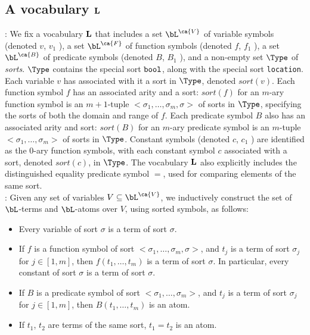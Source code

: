 \subsection{A vocabulary ${\bf L}$}\label{sec:alpha}

: We fix a vocabulary ${\bf L}$
that includes a set $\bL^{\ca{V}}$ of variable symbols (denoted $v$,
$v_1$ \etc), a set $\bL^{\ca{F}}$ of function symbols (denoted $f$,
$f_1$ \etc), a set $\bL^{\ca{B}}$ of predicate symbols (denoted $B$,
$B_1$ \etc), and a non-empty set $\Type$ of {\em sorts}.  $\Type$
contains the special sort ${\tt bool}$,  along with the special sort
{\tt location}. Each variable $v$ has associated with it a sort in
$\Type$, denoted $sort(v)$. Each function symbol $f$ has an associated
arity and a sort: $sort(f)$ for an $m$-ary function symbol is an $m +
1$-tuple $<\sigma_1,\ldots, \sigma_m, \sigma>$ of sorts in $\Type$,
specifying the sorts of both the domain and range of $f$.  Each
predicate symbol $B$ also has an associated arity and sort: $sort(B)$
for an $m$-ary predicate symbol is an $m$-tuple $<\sigma_1,\ldots,
\sigma_m>$ of sorts in $\Type$.  Constant symbols (denoted $c$, $c_1$
\etc) are identified as the $0$-ary function symbols, with each
constant symbol $c$ associated with a sort, denoted $sort(c)$, in
$\Type$.  The vocabulary ${\bf L}$ also explicitly includes the
distinguished equality predicate symbol $=$, used for comparing
elements of the same sort. \\

: 
Given any set of variables $V \subseteq \bL^{\ca{V}}$, we inductively
construct the set of $\bL$-terms and $\bL$-atoms over $V$, 
using sorted symbols, as follows:

\begin{itemize}
\item Every variable of sort $\sigma$ is a term of sort $\sigma$.
\item If $f$ is a function symbol of sort
$<\sigma_1,\ldots,\sigma_m,\sigma>$, and $t_j$ is a term of sort 
$\sigma_j$ for $j \in [1,m]$, then $f(t_1,\ldots, t_m)$ is a 
term of sort $\sigma$.
In particular, every constant of sort $\sigma$ is a term of sort 
$\sigma$.
\item If $B$ is a predicate symbol of sort $<\sigma_1, \ldots,
\sigma_m>$, and $t_j$ is a term of sort $\sigma_j$ for $j \in
[1,m]$, then $B(t_1,\ldots, t_m)$ is an atom.
\item If $t_1$, $t_2$ are terms of the same sort, $t_1 = t_2$ 
is an atom.
\end{itemize}

